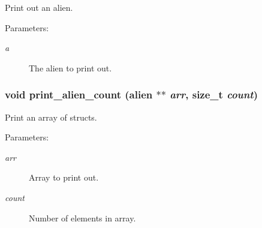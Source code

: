 Print out an alien. 

\begin{Desc}
\item[Parameters:]
\begin{description}
\item[{\em a}]The alien to print out. \end{description}
\end{Desc}
\subsubsection{\setlength{\rightskip}{0pt plus 5cm}void print\_\-alien\_\-count (\bf{alien} $\ast$$\ast$ {\em arr}, size\_\-t {\em count})}\label{struct_8h_96c379831d4206c4a5670f8ab170f716}


Print an array of structs. 

\begin{Desc}
\item[Parameters:]
\begin{description}
\item[{\em arr}]Array to print out. \item[{\em count}]Number of elements in array. \end{description}
\end{Desc}
